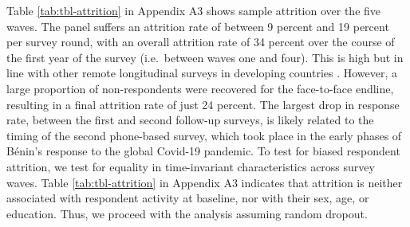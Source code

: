 \documentclass[
  a4paper, twoside, 12pt]{book}
\begin{document}
Table \ref{tab:tbl-attrition} in Appendix A3 shows sample attrition over the five waves. The panel suffers an attrition rate of between 9 percent and 19 percent per survey round, with an overall attrition rate of 34 percent over the course of the first year of the survey (i.e.~between waves one and four). This is high but in line with other remote longitudinal surveys in developing countries \autocite{demombynes2013,ballivian2015}. However, a large proportion of non-respondents were recovered for the face-to-face endline, resulting in a final attrition rate of just 24 percent. The largest drop in response rate, between the first and second follow-up surveys, is likely related to the timing of the second phone-based survey, which took place in the early phases of Bénin's response to the global Covid-19 pandemic. To test for biased respondent attrition, we test for equality in time-invariant characteristics across survey waves. Table \ref{tab:tbl-attrition} in Appendix A3 indicates that attrition is neither associated with respondent activity at baseline, nor with their sex, age, or education. Thus, we proceed with the analysis assuming random dropout.
\end{document}
